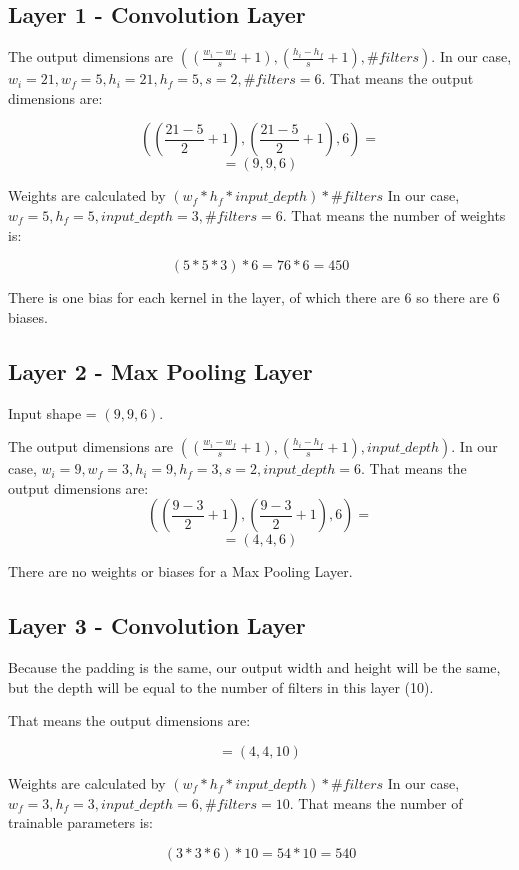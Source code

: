 \documentclass[12pt]{article}
\begin{document}
\subsection{Layer 1 - Convolution Layer}

The output dimensions are $((\frac{w_i - w_f}{s} + 1), (\frac{h_i - h_f}{s} + 1), \# filters)$.
In our case, $w_i = 21, w_f = 5, h_i = 21, h_f = 5, s = 2, \# filters = 6$.
That means the output dimensions are:

$$
((\frac{21 - 5}{2} + 1), (\frac{21 - 5}{2} + 1), 6) =
$$
$$
= (9, 9, 6)
$$

Weights are calculated by $(w_f * h_f * input\_depth) * \# filters$
In our case, $w_f = 5, h_f = 5, input\_depth = 3, \# filters = 6$.
That means the number of weights is:

$$
(5 * 5 * 3) * 6 = 76 * 6 = 450
$$

There is one bias for each kernel in the layer, of which there are 6 so there are 6 biases.

\subsection{Layer 2 - Max Pooling Layer}

Input shape = $(9, 9, 6)$.

The output dimensions are $((\frac{w_i - w_f}{s} + 1), (\frac{h_i - h_f}{s} + 1), input\_depth)$.
In our case, $w_i = 9, w_f = 3, h_i = 9, h_f = 3, s = 2, input\_depth = 6$.
That means the output dimensions are:
$$
((\frac{9 - 3}{2} + 1), (\frac{9 - 3}{2} + 1), 6) =
$$
$$
= (4, 4, 6)
$$

There are no weights or biases for a Max Pooling Layer.

\subsection{Layer 3 - Convolution Layer}

Because the padding is the same, our output width and height will be the same, but the depth will
 be equal to the number of filters in this layer (10).

That means the output dimensions are:

$$
= (4, 4, 10)
$$


Weights are calculated by $(w_f * h_f * input\_depth) * \# filters$
In our case, $w_f = 3, h_f = 3, input\_depth = 6, \# filters = 10$.
That means the number of trainable parameters is:

$$
(3 * 3 * 6) * 10 = 54 * 10 = 540
$$
\end{document}
